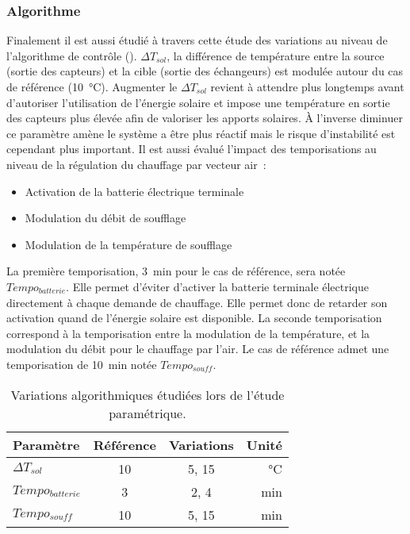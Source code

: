 \subsubsection{Algorithme} %
\label{ssub:variations_algorithmiques}
Finalement il est aussi étudié à travers cette étude des variations au niveau de
l’algorithme de contrôle (). $\Delta T_{sol}$, la différence de
température entre la source (sortie des capteurs) et la cible (sortie des échangeurs) est
modulée autour du cas de référence (\SI{10}{\celsius}). Augmenter le $\Delta T_{sol}$
revient à attendre plus longtemps avant d’autoriser l’utilisation de l’énergie solaire et
impose une température en sortie des capteurs plus élevée afin de valoriser les apports
solaires. À l’inverse diminuer ce paramètre amène le système a être plus réactif mais le
risque d’instabilité est cependant plus important. Il est aussi évalué l’impact des
temporisations au niveau de la régulation du chauffage par vecteur air~:
\begin{itemize}
  \item Activation de la batterie électrique terminale
  \item Modulation du débit de soufflage
  \item Modulation de la température de soufflage
\end{itemize}
La première temporisation, \SI{3}{min} pour le cas de référence, sera notée
$Tempo_{batterie}$. Elle permet d’éviter d’activer la batterie terminale électrique
directement à chaque demande de chauffage. Elle permet donc de retarder son activation
quand de l’énergie solaire est disponible. La seconde temporisation correspond à la temporisation
entre la modulation de la température, et la modulation du débit pour le chauffage par
l’air. Le cas de référence admet une temporisation de \SI{10}{min} notée $Tempo_{souff}$.

\begin{table}
\centering
\caption[Variations algorithmiques étudiées lors de l’étude paramétrique]
        {Variations algorithmiques étudiées lors de l’étude paramétrique.}
\label{tab:variations_algo}
\begin{tabular}{l c c r}
    \toprule
    Paramètre          & Référence & Variations          & Unité         \\
    \midrule
    $\Delta T_{sol}$     & \num{10}  & \num{5}, \num{15}   & \si{\celsius} \\
    $Tempo_{batterie}$ & \num{3}   & \num{2}, \num{4}    & \si{min}      \\
    $Tempo_{souff}$    & \num{10}  & \num{5}, \num{15}   & \si{min}      \\
    \bottomrule
\end{tabular}
\end{table}



